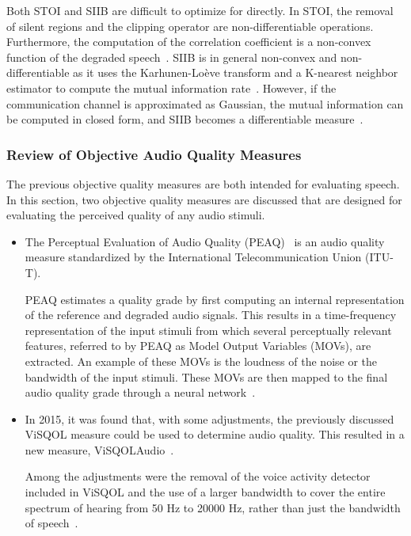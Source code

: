 Both STOI and SIIB are difficult to optimize for directly. 
In STOI, the removal of silent regions and the clipping operator are non-differentiable operations.
Furthermore, the computation of the correlation coefficient is a non-convex function of the degraded speech~\cite{taal2011algorithm}.
SIIB is in general non-convex and non-differentiable as it uses the Karhunen-Lo\`eve transform and a 
K-nearest neighbor estimator to compute the mutual information rate~\cite{van2017instrumental}.
However, if the communication channel is approximated as Gaussian, the mutual information can be computed in closed form,
and SIIB becomes a differentiable measure~\cite{van2017instrumental}.

\subsubsection{Review of Objective Audio Quality Measures}
The previous objective quality measures are both intended for evaluating speech.
In this section, two objective quality measures are discussed that are designed for evaluating the perceived quality of any audio stimuli.
\begin{itemize}
    \item 
    The Perceptual Evaluation of Audio Quality (PEAQ)~\cite{thiede2000peaq} is an audio quality measure standardized by the International Telecommunication Union (ITU-T).

    PEAQ estimates a quality grade by first computing an internal representation of the reference and degraded audio signals.
    This results in a time-frequency representation of the input stimuli from which several perceptually relevant features, referred to by PEAQ as Model Output Variables (MOVs), are extracted.
    An example of these MOVs is the loudness of the noise or the bandwidth of the input stimuli.
    These MOVs are then mapped to the final audio quality grade through a neural network~\cite{thiede2000peaq}.
    \item 
    In 2015, it was found that, with some adjustments, the previously discussed ViSQOL measure
    could be used to determine audio quality. 
    This resulted in a new measure, ViSQOLAudio~\cite{hines2015visqolaudio}.

    Among the adjustments were the removal of the voice activity detector included in ViSQOL and the use of a larger bandwidth to cover the entire spectrum of hearing from 50 Hz to 20000 Hz, rather than just the bandwidth of speech~\cite{hines2015visqolaudio}.
\end{itemize}

